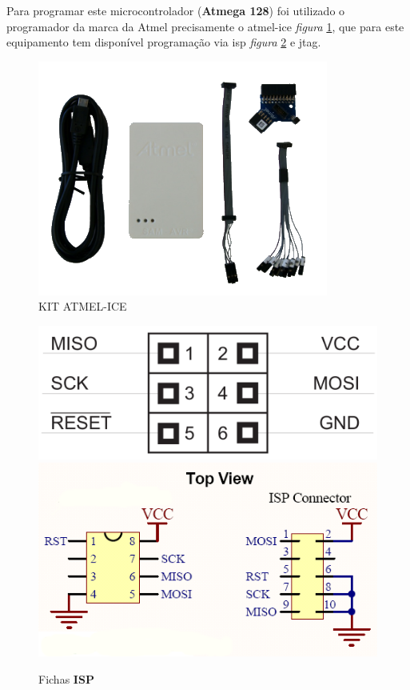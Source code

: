 \newpage
Para programar este microcontrolador (\textbf{Atmega 128}) foi utilizado o programador da marca da Atmel precisamente o \ac{atmel-ice} \textit{figura} \ref{Programador_1}, que para este equipamento tem disponível programação via \ac{isp} \textit{figura} \ref{ISP_6_8_10pin} e \ac{jtag}.
\begin{minipage}[!b]{.5\linewidth}
	\begin{figure}[H]
		\captionsetup{justification=raggedright,singlelinecheck=false}
		\flushleft
		\includegraphics[scale=0.75]{./image/PESTA/programador/Atmel_ice.png}
		\caption{KIT ATMEL-ICE}
		\label{Programador_1}
	\end{figure}
\end{minipage}
\hspace{.5cm}
\begin{minipage}[!b]{.5\linewidth}
	\begin{figure}[H]
		\captionsetup{justification=raggedright,singlelinecheck=false}
		\flushleft
		\includegraphics[scale=0.45]{./image/PESTA/programador/isp_6pin.png}
		\hspace{.3cm}
		\includegraphics[scale=0.5]{./image/PESTA/programador/isp_8e10pin.png}
		\caption{Fichas \textbf{ISP}}
		\label{ISP_6_8_10pin}
	\end{figure}
\end{minipage}
